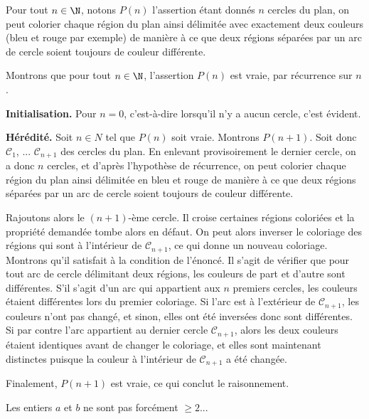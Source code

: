 \begin{Soln}{40}
Pour tout $n\in \N$, notons $P(n)$ l'assertion \og  étant donnés $n$ cercles du plan, on peut colorier chaque région du plan ainsi délimitée avec exactement deux couleurs (bleu et rouge par exemple) de manière à ce que deux régions séparées par un arc de cercle soient toujours de couleur différente.\fg

Montrons que pour tout $n\in \N$, l'assertion $P(n)$ est vraie, par récurrence sur $n$.

\noindent \textbf{Initialisation.} Pour $n=0$, c'est-à-dire lorsqu'il n'y a aucun cercle, c'est évident.

\noindent \textbf{Hérédité.} Soit $n\in N$ tel que $P(n)$ soit vraie. Montrons $P(n+1)$. Soit donc $\mathcal C_1$, ... $\mathcal C_{n+1}$ des cercles du plan. En enlevant provisoirement le dernier cercle, on a donc $n$ cercles, et d'après l'hypothèse de récurrence, on peut colorier chaque région du plan ainsi délimitée en bleu et rouge de manière à ce que deux régions séparées par un arc de cercle soient toujours de couleur différente.

Rajoutons alors le $(n+1)$-ème cercle. Il croise certaines régions coloriées et la propriété demandée tombe alors en défaut. On peut alors inverser le coloriage des régions qui sont à l'intérieur de $\mathcal C_{n+1}$, ce qui donne un nouveau coloriage. Montrons qu'il satisfait à la condition de l'énoncé. Il s'agit de vérifier que pour tout arc de cercle délimitant deux régions, les couleurs de part et d'autre sont différentes. S'il s'agit d'un arc qui appartient aux $n$ premiers cercles, les couleurs étaient différentes lors du premier coloriage. Si l'arc est à l'extérieur de $\mathcal C_{n+1}$, les couleurs n'ont pas changé, et sinon, elles ont été inversées donc sont différentes. Si par contre l'arc appartient au dernier cercle $\mathcal C_{n+1}$, alors les deux couleurs étaient identiques avant de changer le coloriage, et elles sont maintenant distinctes puisque la couleur à l'intérieur de $\mathcal C_{n+1}$ a été changée.

Finalement, $P(n+1)$ est vraie, ce qui conclut le raisonnement.
\end{Soln}
\begin{Soln}{41}
Les entiers $a$ et $b$ ne sont pas forcément $\geq 2$...
\end{Soln}
